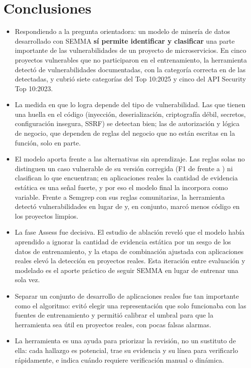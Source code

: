 \documentclass[12pt,a4paper]{article}
\begin{document}
\section{Conclusiones}
\begin{itemize}
  \item Respondiendo a la pregunta orientadora: un modelo de minería de datos desarrollado con SEMMA \textbf{sí permite identificar y clasificar} una parte importante de las vulnerabilidades de un proyecto de microservicios. En cinco proyectos vulnerables que no participaron en el entrenamiento, la herramienta detectó \extDetectadas{} de \extDocumentadas{} vulnerabilidades documentadas, con la categoría correcta en \extCategoriaPct{} de las detectadas, y cubrió siete categorías del Top 10:2025 y cinco del API Security Top 10:2023.
  \item La medida en que lo logra depende del tipo de vulnerabilidad. Las que tienen una huella en el código (inyección, deserialización, criptografía débil, secretos, configuración insegura, SSRF) se detectan bien; las de autorización y lógica de negocio, que dependen de reglas del negocio que no están escritas en la función, solo en parte.
  \item El modelo aporta frente a las alternativas sin aprendizaje. Las reglas solas no distinguen un caso vulnerable de su versión corregida (F1 de \ablReglasDesarrolloF{} frente a \ablCompletoF{}) ni clasifican lo que encuentran; en aplicaciones reales la cantidad de evidencia estática es una señal fuerte, y por eso el modelo final la incorpora como variable. Frente a Semgrep con sus reglas comunitarias, la herramienta detectó \sgVulnminer{} vulnerabilidades en lugar de \sgDetectadas{} y, en conjunto, marcó menos código en los proyectos limpios.
  \item La fase Assess fue decisiva. El estudio de ablación reveló que el modelo había aprendido a ignorar la cantidad de evidencia estática por un sesgo de los datos de entrenamiento, y la etapa de combinación ajustada con aplicaciones reales elevó la detección en proyectos reales. Esta iteración entre evaluación y modelado es el aporte práctico de seguir SEMMA en lugar de entrenar una sola vez.
  \item Separar un conjunto de desarrollo de aplicaciones reales fue tan importante como el algoritmo: evitó elegir una representación que solo funcionaba con las fuentes de entrenamiento y permitió calibrar el umbral para que la herramienta sea útil en proyectos reales, con pocas falsas alarmas.
  \item La herramienta es una ayuda para priorizar la revisión, no un sustituto de ella: cada hallazgo es potencial, trae su evidencia y su línea para verificarlo rápidamente, e indica cuándo requiere verificación manual o dinámica.
\end{itemize}
\end{document}
